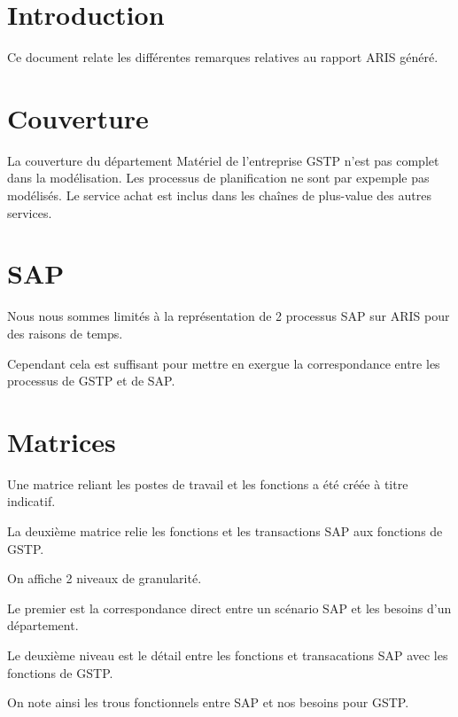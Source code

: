 \documentclass[a4paper]{article}
\begin{document}
\maketitle

\section{Introduction}

Ce document relate les différentes remarques relatives au rapport ARIS généré. 

\section{Couverture}

La couverture du département Matériel de l'entreprise GSTP n'est pas complet 
dans la modélisation. Les processus de planification ne sont par expemple pas 
modélisés. Le service achat est inclus dans les chaînes de plus-value des autres 
services.

\section{SAP}

Nous nous sommes limités à la représentation de 2 processus SAP sur ARIS pour 
des raisons de temps.

Cependant cela est suffisant pour mettre en exergue la correspondance entre les 
processus de GSTP et de SAP.

\section{Matrices}

Une matrice reliant les postes de travail et les fonctions a été créée à titre 
indicatif.

La deuxième matrice relie les fonctions et les transactions SAP aux fonctions 
de GSTP.

On affiche 2 niveaux de granularité.

Le premier est la correspondance direct entre un scénario SAP et les besoins 
d'un département. 

Le deuxième niveau est le détail entre les fonctions et transacations SAP avec 
les fonctions de GSTP.

On note ainsi les trous fonctionnels entre SAP et nos besoins pour GSTP.
\end{document}
